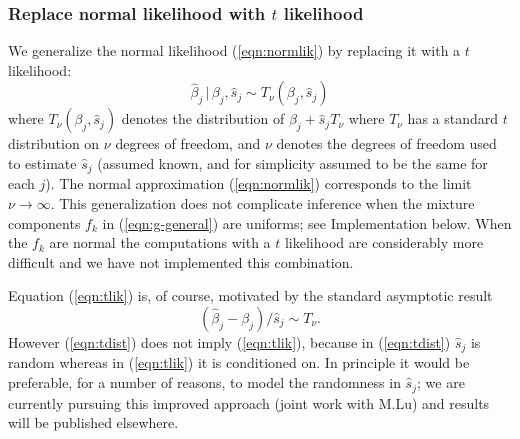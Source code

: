 \documentclass[11pt]{article}
\def\bhat{\hat{\beta}}
\def\shat{\hat{s}}
\begin{document}


\subsubsection*{Replace normal likelihood with $t$ likelihood}

We generalize the normal likelihood (\ref{eqn:normlik}) by replacing it with a $t$ likelihood:
  \begin{equation} \label{eqn:tlik}
 \bhat_j \, | \, \beta_j, \shat_j \sim T_\nu(\beta_j, \shat_j)
 \end{equation}
where $T_\nu(\beta_j,\shat_j)$ denotes the distribution of $\beta_j+\shat_j T_\nu$ where $T_\nu$ has a standard $t$ distribution on $\nu$ degrees of freedom,
and  $\nu$ denotes the degrees of freedom used to estimate $\shat_j$ (assumed known, and for simplicity assumed to be the same for each $j$).
The normal approximation (\ref{eqn:normlik}) corresponds to the limit $\nu \rightarrow \infty$.
This generalization does not complicate inference when the mixture components $f_k$ in (\ref{eqn:g-general}) are uniforms; see Implementation below.
When the $f_k$ are normal the computations with a $t$ likelihood are considerably more difficult and we have not implemented this combination.

Equation (\ref{eqn:tlik}) is, of course, motivated by the standard asymptotic result
\begin{equation} \label{eqn:tdist}
(\bhat_j-\beta_j)/\shat_j \sim T_\nu.
\end{equation}
However (\ref{eqn:tdist}) does not imply (\ref{eqn:tlik}), because in (\ref{eqn:tdist}) $\shat_j$ is random whereas in (\ref{eqn:tlik}) it is conditioned on.
In principle it would be preferable, for a number of reasons, to model the randomness in $\shat_j$; we are
currently pursuing this improved approach (joint work with M.Lu) and results will be published elsewhere. 
\end{document}
